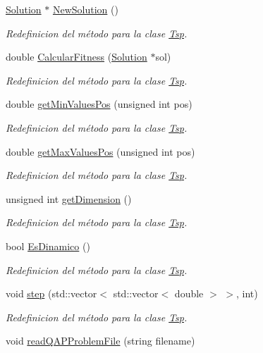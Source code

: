 \begin{DoxyCompactItemize}
\item 
\hyperlink{class_solution}{Solution} $\ast$ \hyperlink{class_qap_a4493347601b4458092eb443ee8499743}{New\+Solution} ()
\begin{DoxyCompactList}\small\item\em Redefinicion del método para la clase \hyperlink{class_tsp}{Tsp}. \end{DoxyCompactList}\item 
double \hyperlink{class_qap_a05d324d41f7d70c8057b7b35a2f2aeab}{Calcular\+Fitness} (\hyperlink{class_solution}{Solution} $\ast$sol)
\begin{DoxyCompactList}\small\item\em Redefinicion del método para la clase \hyperlink{class_tsp}{Tsp}. \end{DoxyCompactList}\item 
double \hyperlink{class_qap_a8b736df9c6b69a4f1f2c76921b1d9992}{get\+Min\+Values\+Pos} (unsigned int pos)
\begin{DoxyCompactList}\small\item\em Redefinicion del método para la clase \hyperlink{class_tsp}{Tsp}. \end{DoxyCompactList}\item 
double \hyperlink{class_qap_ac0d42b8ed406cad3c960505628f4f35c}{get\+Max\+Values\+Pos} (unsigned int pos)
\begin{DoxyCompactList}\small\item\em Redefinicion del método para la clase \hyperlink{class_tsp}{Tsp}. \end{DoxyCompactList}\item 
unsigned int \hyperlink{class_qap_a82bf0c0567c7e5bbfcef5ec7b4281409}{get\+Dimension} ()
\begin{DoxyCompactList}\small\item\em Redefinicion del método para la clase \hyperlink{class_tsp}{Tsp}. \end{DoxyCompactList}\item 
bool \hyperlink{class_qap_ac338b0a23c2565cd014a193569a33870}{Es\+Dinamico} ()
\begin{DoxyCompactList}\small\item\em Redefinicion del método para la clase \hyperlink{class_tsp}{Tsp}. \end{DoxyCompactList}\item 
void \hyperlink{class_qap_a3bb1b7cc62a0f0f0ddd9e2644cea2b7f}{step} (std\+::vector$<$ std\+::vector$<$ double $>$ $>$, int)
\begin{DoxyCompactList}\small\item\em Redefinicion del método para la clase \hyperlink{class_tsp}{Tsp}. \end{DoxyCompactList}\item 
void \hyperlink{class_qap_a0c90fc0c866ba30a979a8a28e7d95336}{read\+Q\+A\+P\+Problem\+File} (string filename)
\end{DoxyCompactItemize}
